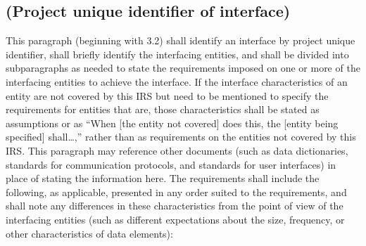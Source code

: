 \documentclass{fidata-report-template}
\begin{document}
\subsection{(Project unique identifier of interface)}

This paragraph (beginning with 3.2) shall identify an interface by
project unique identifier, shall briefly identify the interfacing
entities, and shall be divided into subparagraphs as needed to state the
requirements imposed on one or more of the interfacing entities to
achieve the interface. If the interface characteristics of an entity are
not covered by this IRS but need to be mentioned to specify the
requirements for entities that are, those characteristics shall be
stated as assumptions or as ``When {[}the entity not covered{]} does
this, the {[}entity being specified{]} shall\ldots{},'' rather than as
requirements on the entities not covered by this IRS. This paragraph may
reference other documents (such as data dictionaries, standards for
communication protocols, and standards for user interfaces) in place of
stating the information here. The requirements shall include the
following, as applicable, presented in any order suited to the
requirements, and shall note any differences in these characteristics
from the point of view of the interfacing entities (such as different
expectations about the size, frequency, or other characteristics of data
elements):
\end{document}
